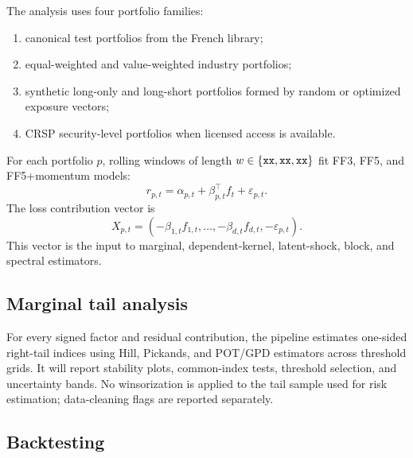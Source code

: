 The analysis uses four portfolio families:
\begin{enumerate}
\item canonical test portfolios from the French library;
\item equal-weighted and value-weighted industry portfolios;
\item synthetic long-only and long-short portfolios formed by random or
optimized exposure vectors;
\item CRSP security-level portfolios when licensed access is available.
\end{enumerate}
For each portfolio \(p\), rolling windows of length \(w\in\{\xx,\xx,\xx\}\)
fit FF3, FF5, and FF5+momentum models:
\[
  r_{p,t}=\alpha_{p,t}+\beta_{p,t}^\top f_t+\varepsilon_{p,t}.
\]
The loss contribution vector is
\[
  X_{p,t}=(-\beta_{1,t}f_{1,t},\ldots,-\beta_{d,t}f_{d,t},-\varepsilon_{p,t}).
\]
This vector is the input to marginal, dependent-kernel, latent-shock, block,
and spectral estimators.

\subsection{Marginal tail analysis}

For every signed factor and residual contribution, the pipeline estimates
one-sided right-tail indices using Hill, Pickands, and POT/GPD estimators
across threshold grids. It will report stability plots, common-index tests,
threshold selection, and uncertainty bands. No winsorization is applied to
the tail sample used for risk estimation; data-cleaning flags are reported
separately.

\begin{table}[p]
\centering

\caption[Real-data tail-index estimates]{Tail-index estimates for signed factor and residual contributions. Values are
\xx{} placeholders. The final table will report Hill, Pickands, and POT
estimates, selected thresholds, standard errors or bootstrap intervals, and
common-index diagnostic outcomes.}
\label{tab:tail-index-placeholder}
\end{table}





\subsection{Backtesting}

